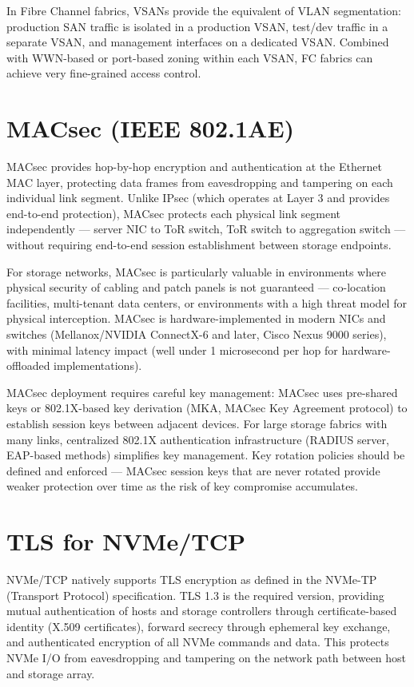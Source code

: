 In Fibre Channel fabrics, VSANs provide the equivalent of VLAN segmentation: production SAN traffic is isolated in a production VSAN, test/dev traffic in a separate VSAN, and management interfaces on a dedicated VSAN. Combined with WWN-based or port-based zoning within each VSAN, FC fabrics can achieve very fine-grained access control.

\section{MACsec (IEEE 802.1AE)}
MACsec provides hop-by-hop encryption and authentication at the Ethernet MAC layer, protecting data frames from eavesdropping and tampering on each individual link segment. Unlike IPsec (which operates at Layer 3 and provides end-to-end protection), MACsec protects each physical link segment independently --- server NIC to ToR switch, ToR switch to aggregation switch --- without requiring end-to-end session establishment between storage endpoints.

For storage networks, MACsec is particularly valuable in environments where physical security of cabling and patch panels is not guaranteed --- co-location facilities, multi-tenant data centers, or environments with a high threat model for physical interception. MACsec is hardware-implemented in modern NICs and switches (Mellanox/NVIDIA ConnectX-6 and later, Cisco Nexus 9000 series), with minimal latency impact (well under 1 microsecond per hop for hardware-offloaded implementations).

MACsec deployment requires careful key management: MACsec uses pre-shared keys or 802.1X-based key derivation (MKA, MACsec Key Agreement protocol) to establish session keys between adjacent devices. For large storage fabrics with many links, centralized 802.1X authentication infrastructure (RADIUS server, EAP-based methods) simplifies key management. Key rotation policies should be defined and enforced --- MACsec session keys that are never rotated provide weaker protection over time as the risk of key compromise accumulates.

\section{TLS for NVMe/TCP}
NVMe/TCP natively supports TLS encryption as defined in the NVMe-TP (Transport Protocol) specification. TLS 1.3 is the required version, providing mutual authentication of hosts and storage controllers through certificate-based identity (X.509 certificates), forward secrecy through ephemeral key exchange, and authenticated encryption of all NVMe commands and data. This protects NVMe I/O from eavesdropping and tampering on the network path between host and storage array.

